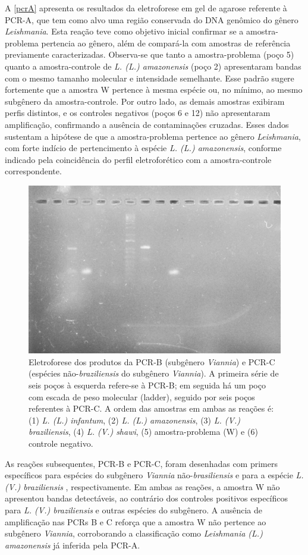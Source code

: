 A \cref{pcrA} apresenta os resultados da eletroforese em gel de agarose referente à PCR-A, que tem como alvo uma região conservada do DNA genômico do gênero
 \textit{Leishmania}. Esta reação teve como objetivo inicial confirmar se a amostra-problema pertencia ao gênero, além de compará-la com amostras de referência previamente 
 caracterizadas. Observa-se que tanto a amostra-problema (poço 5) quanto a amostra-controle de \textit{L. (L.) amazonensis} (poço 2) apresentaram bandas com o mesmo tamanho 
 molecular e intensidade semelhante. Esse padrão sugere fortemente que a amostra W pertence à mesma espécie ou, no mínimo, ao mesmo subgênero da amostra-controle. Por outro 
 lado, as demais amostras  exibiram perfis distintos, e os controles negativos (poços 6 e 12) não apresentaram amplificação, confirmando a ausência de contaminações cruzadas.
Esses dados sustentam a hipótese de que a amostra-problema pertence ao gênero \textit{Leishmania}, com forte indício de pertencimento à espécie \textit{L. (L.) amazonensis}, 
conforme indicado pela coincidência do perfil eletroforético com a amostra-controle correspondente.

\begin{figure}
 \centering
 \includegraphics[width=.4\textwidth]{fig/pcrBeC_g8.jpg}
 \caption{Eletroforese dos produtos da PCR-B (subgênero \textit{Viannia}) e PCR-C (espécies não-\textit{braziliensis} do subgênero \textit{Viannia}). 
 A primeira série de seis poços à esquerda refere-se à PCR-B; em seguida há um poço com escada de peso molecular (ladder), seguido por seis poços referentes 
 à PCR-C. A ordem das amostras em ambas as reações é: (1) \textit{L. (L.) infantum}, (2) \textit{L. (L.) amazonensis}, (3) \textit{L. (V.) braziliensis}, 
 (4) \textit{L. (V.) shawi}, (5) amostra-problema (W) e (6) controle negativo.}
 \label{pcrBC}
 \end{figure}

As reações subsequentes, PCR-B e PCR-C, foram desenhadas com primers específicos
para espécies do subgênero \textit{Viannia} não-\textit{brasiliensis} e
para a espécie \textit{L. (V.) braziliensis
}, respectivamente. Em ambas as reações, a amostra W não apresentou
bandas detectáveis, ao contrário dos controles positivos específicos para
\textit{L. (V.) braziliensis} e outras espécies do subgênero. A ausência de
amplificação nas PCRs B e C reforça que a amostra W não pertence ao subgênero
\textit{Viannia}, corroborando a classificação como \textit{Leishmania
(L.) amazonensis} já inferida pela PCR-A.

